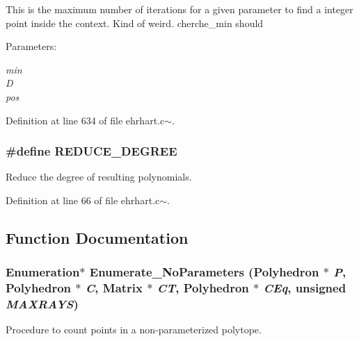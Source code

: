 This is the maximum number of iterations for a given parameter to find a integer point inside the context. Kind of weird. cherche\_\-min should



\begin{Desc}
\item[Parameters: ]\par
\begin{description}
\item[{\em 
min}]\item[{\em 
D}]\item[{\em 
pos}]\end{description}
\end{Desc}


Definition at line 634 of file ehrhart.c$\sim$.
\subsubsection{\setlength{\rightskip}{0pt plus 5cm}\#define REDUCE\_\-DEGREE}\label{ehrhart_8c~_a1}


Reduce the degree of resulting polynomials.



Definition at line 66 of file ehrhart.c$\sim$.

\subsection{Function Documentation}
\subsubsection{\setlength{\rightskip}{0pt plus 5cm}Enumeration$\ast$ Enumerate\_\-No\-Parameters (Polyhedron $\ast$ {\em P}, Polyhedron $\ast$ {\em C}, Matrix $\ast$ {\em CT}, Polyhedron $\ast$ {\em CEq}, unsigned {\em MAXRAYS})}\label{ehrhart_8c~_a26}


Procedure to count points in a non-parameterized polytope.

